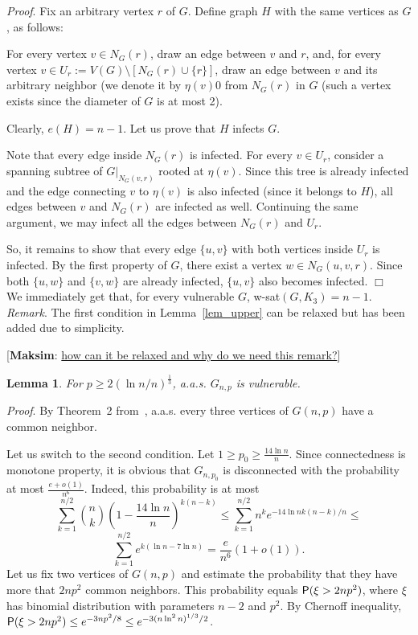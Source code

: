 \documentclass[]{article}
\newtheorem{lemma}[theorem]{Lemma}
\begin{document}
{\it Proof}. Fix an arbitrary vertex $r$ of $G$. Define graph $H$ with the same vertices as $G$, as follows:

For every vertex $v\in N_G(r)$, draw an edge between $v$ and $r$, and, for every vertex $v\in U_r:=V(G)\setminus [N_G(r)\cup\{r\}]$, draw an edge between $v$ and its arbitrary neighbor (we denote it by $\eta(v)$0 from $N_G(r)$ in $G$ (such a vertex exists since the diameter of $G$ is at most 2). 

Clearly, $e(H)=n-1$. Let us prove that $H$ infects $G$. 

Note that every edge inside $N_G(r)$ is infected. For every $v \in U_r$, consider a spanning subtree of $G|_{N_G(v,r)}$ rooted at $\eta(v)$. Since this tree is already infected and the edge connecting $v$ to $\eta(v)$ is also infected (since it belongs to $H$), all edges between $v$ and $N_G(r)$ are infected as well. Continuing the same argument, we may infect all the edges between $N_G(r)$ and $U_r$.

So, it remains to show that every edge $\{u,v\}$ with both vertices inside $U_r$ is infected. By the first property of $G$, there exist a vertex $w \in N_G(u,v,r)$. Since both $\{u,w\}$ and $\{v,w\}$ are already infected, $\{u,v\}$ also becomes infected. $\Box$\\

We immediately get that, for every vulnerable $G$, w-sat$(G,K_3)=n-1$.\\


{\it Remark}. The first condition in Lemma~\ref{lem_upper} can be relaxed but has been added due to simplicity. 

[{\bf Maksim}: \underline{how can it be relaxed and why do we need this remark?}]


\begin{lemma}
	For $p\geq 2(\ln n/n)^{\frac 13}$, a.a.s. $G_{n,p}$ is vulnerable.
\end{lemma}

{\it Proof}. By Theorem~2 from~\cite{Spencer_extensions}, a.a.s. every three vertices of $G(n,p)$ have a common neighbor.

Let us switch to the second condition. Let $1\geq p_0\geq\frac{14\ln n}{n}$. Since connectedness is monotone property, it is obvious that $G_{n,p_0}$ is disconnected with the probability at most $\frac{e+o(1)}{n^6}$. Indeed, this probability is at most
$$
\sum_{k=1}^{n/2}{n\choose k}\left(1-\frac{14\ln n}{n}\right)^{k(n-k)}\leq \sum_{k=1}^{n/2} n^k e^{-14\ln n k(n-k)/n}\leq
$$
$$
\sum_{k=1}^{n/2} e^{k(\ln n-7\ln n)}=\frac{e}{n^6}(1+o(1)).
$$
Let us fix two vertices of $G(n,p)$ and estimate the probability that they have more that $2np^2$ common neighbors. This probability equals ${\sf P}(\xi>2np^2)$, where $\xi$ has binomial distribution with parameters $n-2$ and $p^2$. By Chernoff inequality, ${\sf P}(\xi>2np^2)\leq e^{-3np^2/8}\leq e^{-3(n\ln^2 n)^{1/3}/2}$.
\end{document}
